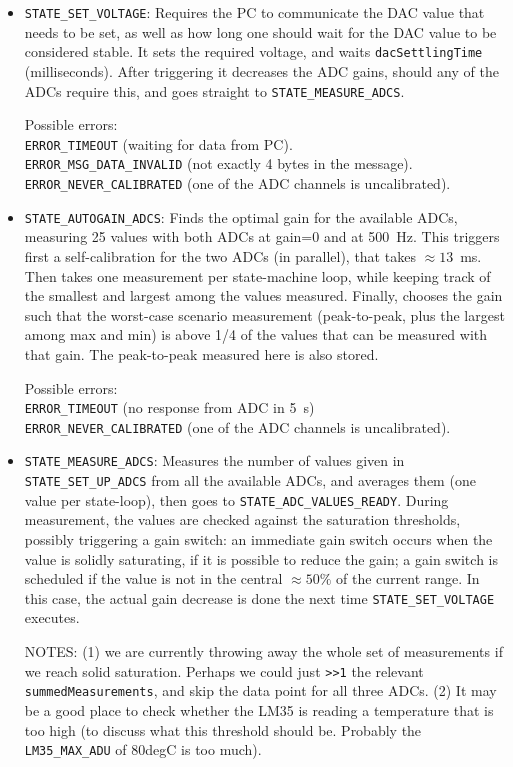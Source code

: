 \documentclass[11pt,a4paper,english]{article}
\begin{document}
\begin{itemize}
\item \texttt{STATE\_SET\_VOLTAGE}: Requires the PC to communicate the DAC value that needs to be set, as well as how long one should wait for the DAC value to be considered stable. It sets the required voltage, and waits \texttt{dacSettlingTime} (milliseconds). After triggering it decreases the ADC gains, should any of the ADCs require this, and goes straight to \texttt{STATE\_MEASURE\_ADCS}.
	
	Possible errors:\\\texttt{ERROR\_TIMEOUT} (waiting for data from PC).\\\texttt{ERROR\_MSG\_DATA\_INVALID} (not exactly 4 bytes in the message).\\\texttt{ERROR\_NEVER\_CALIBRATED} (one of the ADC channels is uncalibrated).

\item \texttt{STATE\_AUTOGAIN\_ADCS}: Finds the optimal gain for the available ADCs, measuring 25 values with both ADCs at gain=0 and at 500~Hz. This triggers first a self-calibration for the two ADCs (in parallel), that takes $\approx13$~ms. Then takes one measurement per state-machine loop, while keeping track of the smallest and largest among the values measured. Finally, chooses the gain such that the worst-case scenario measurement (peak-to-peak, plus the largest among max and min) is above 1/4 of the values that can be measured with that gain. The peak-to-peak measured here is also stored.

	Possible errors:\\\texttt{ERROR\_TIMEOUT} (no response from ADC in 5~s)\\\texttt{ERROR\_NEVER\_CALIBRATED} (one of the ADC channels is uncalibrated).

\item \texttt{STATE\_MEASURE\_ADCS}: Measures the number of values given in \texttt{STATE\_SET\_UP\_ADCS} from all the available ADCs, and averages them (one value per state-loop), then goes to \texttt{STATE\_ADC\_VALUES\_READY}. During measurement, the values are checked against the saturation thresholds, possibly triggering a gain switch: an immediate gain switch occurs when the value is solidly saturating, if it is possible to reduce the gain; a gain switch is scheduled if the value is not in the central $\approx50\%$ of the current range. In this case, the actual gain decrease is done the next time \texttt{STATE\_SET\_VOLTAGE} executes.

NOTES: (1) we are currently throwing away the whole set of measurements if we reach solid saturation. Perhaps we could just \texttt{>>1} the relevant \texttt{summedMeasurements}, and skip the data point for all three ADCs. (2) It may be a good place to check whether the LM35 is reading a temperature that is too high (to discuss what this threshold should be. Probably the \texttt{LM35\_MAX\_ADU} of 80degC is too much).


\end{itemize}
\end{document}
